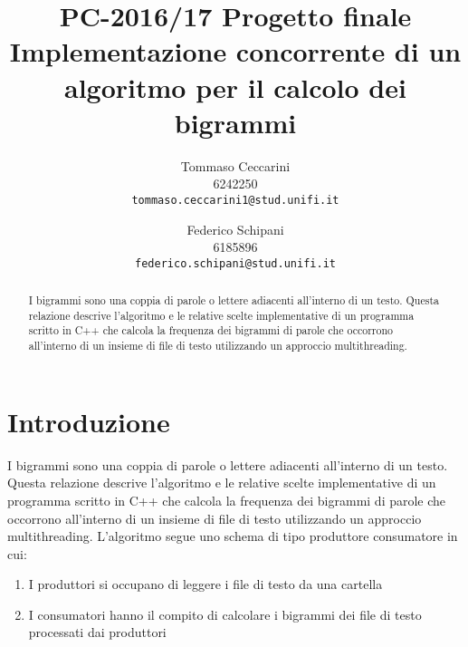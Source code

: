 \documentclass[10pt,twocolumn,letterpaper]{article}
\begin{document}
\title{PC-2016/17 Progetto finale \\
Implementazione concorrente di un algoritmo per il calcolo dei bigrammi}

\author{Tommaso Ceccarini \\
6242250\\
{\tt\small tommaso.ceccarini1@stud.unifi.it}
\and
Federico Schipani\\
6185896\\
{\tt\small federico.schipani@stud.unifi.it}
}

\maketitle
\thispagestyle{empty}

\begin{abstract}
I bigrammi sono una coppia di parole o lettere adiacenti all'interno di un testo. Questa relazione descrive l'algoritmo e le relative scelte implementative di un programma
scritto in C++ che calcola la frequenza dei bigrammi di parole che occorrono all'interno di un insieme di file di testo utilizzando un approccio multithreading. 
\end{abstract}

\section{Introduzione}
\label{sec:introduzione}
I bigrammi sono una coppia di parole o lettere adiacenti all'interno di un testo. Questa relazione descrive l'algoritmo e le relative scelte implementative di un programma
scritto in C++ che calcola la frequenza dei bigrammi di parole che occorrono all'interno di un insieme di file di testo utilizzando un approccio multithreading. 
L'algoritmo segue uno schema di tipo produttore consumatore in cui:
\begin{enumerate}
\item I produttori si occupano di leggere i file di testo da una cartella
\item I consumatori hanno il compito di calcolare i bigrammi dei file di testo processati dai produttori
\end{enumerate}
\end{document}
